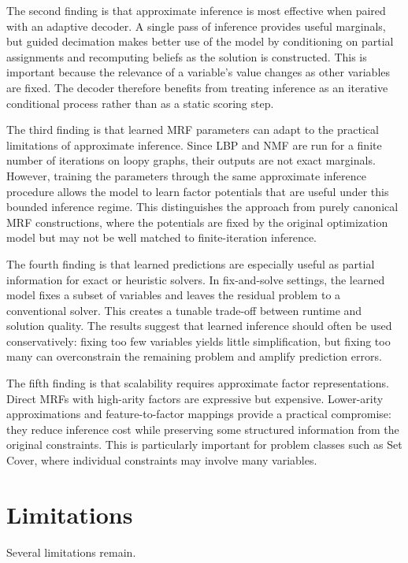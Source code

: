 The second finding is that approximate inference is most effective when paired with an adaptive decoder. A single pass of inference provides useful marginals, but guided decimation makes better use of the model by conditioning on partial assignments and recomputing beliefs as the solution is constructed. This is important because the relevance of a variable's value changes as other variables are fixed. The decoder therefore benefits from treating inference as an iterative conditional process rather than as a static scoring step.

The third finding is that learned MRF parameters can adapt to the practical limitations of approximate inference. Since LBP and NMF are run for a finite number of iterations on loopy graphs, their outputs are not exact marginals. However, training the parameters through the same approximate inference procedure allows the model to learn factor potentials that are useful under this bounded inference regime. This distinguishes the approach from purely canonical MRF constructions, where the potentials are fixed by the original optimization model but may not be well matched to finite-iteration inference.

The fourth finding is that learned predictions are especially useful as partial information for exact or heuristic solvers. In fix-and-solve settings, the learned model fixes a subset of variables and leaves the residual problem to a conventional solver. This creates a tunable trade-off between runtime and solution quality. The results suggest that learned inference should often be used conservatively: fixing too few variables yields little simplification, but fixing too many can overconstrain the remaining problem and amplify prediction errors.

The fifth finding is that scalability requires approximate factor representations. Direct MRFs with high-arity factors are expressive but expensive. Lower-arity approximations and feature-to-factor mappings provide a practical compromise: they reduce inference cost while preserving some structured information from the original constraints. This is particularly important for problem classes such as Set Cover, where individual constraints may involve many variables.

\section{Limitations}

Several limitations remain.

